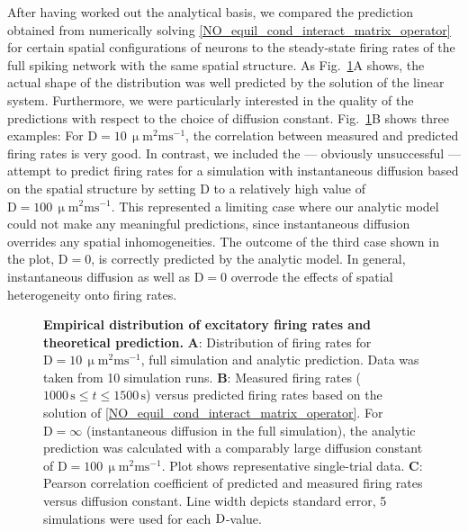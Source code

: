 \documentclass[10pt,letterpaper]{article}
\begin{document}
After having worked out the analytical basis, we compared the prediction obtained from numerically solving \eqref{NO_equil_cond_interact_matrix_operator} for certain spatial configurations of neurons to the steady-state firing rates of the full spiking network with the same spatial structure. As Fig.~\ref{Matrix_Predict_Comp}A shows, the actual shape of the distribution was well predicted by the solution of the linear system. Furthermore, we were particularly interested in the quality of the predictions with respect to the choice of diffusion constant. Fig.~\ref{Matrix_Predict_Comp}B shows three examples: For $\mathrm{D=10\, \upmu m^2 ms^{-1}}$, the correlation between measured and predicted firing rates is very good. In contrast, we included the --- obviously unsuccessful --- attempt to predict firing rates for a simulation with instantaneous diffusion based on the spatial structure by setting D to a relatively high value of $\mathrm{D=100\, \upmu m^2 ms^{-1}}$. This represented a limiting case where our analytic model could not make any meaningful predictions, since instantaneous diffusion overrides any spatial inhomogeneities. The outcome of the third case shown in the plot, $\mathrm{D=0}$, is correctly predicted by the analytic model. In general, instantaneous diffusion as well as $\mathrm{D=0}$ overrode the effects of spatial heterogeneity onto firing rates. 

\begin{figure}
\caption{{\bf Empirical distribution of excitatory firing rates and theoretical prediction.} \textbf{A}: Distribution of firing rates for $\mathrm{D=10\, \upmu m^2 ms^{-1}}$, full simulation and analytic prediction. Data was taken from 10 simulation runs. \textbf{B}: Measured firing rates ($\mathrm{ 1000\,s} \leq t \leq \mathrm{1500\, s}$) versus predicted firing rates based on the solution of  \eqref{NO_equil_cond_interact_matrix_operator}. For $\mathrm{D=\infty}$ (instantaneous diffusion in the full simulation), the analytic prediction was calculated with a comparably large diffusion constant of $\mathrm{D=100\, \upmu m^2 ms^{-1}}$. Plot shows representative single-trial data. \textbf{C}: Pearson correlation coefficient of predicted and measured firing rates versus diffusion constant. Line width depicts standard error, 5 simulations were used for each $\rm D$-value.}
\label{Matrix_Predict_Comp}
\end{figure}
\end{document}
